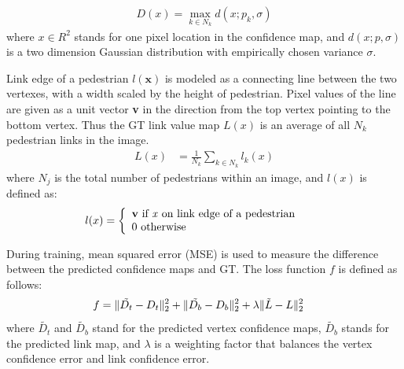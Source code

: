 \documentclass[runningheads]{llncs}
\begin{document}
\begin{align}
	D(x)=\max\limits_{k \in {N_{k}}} d(x; p_{k},\sigma)
\end{align}
where $x \in R^{2}$ stands for one pixel location in the confidence map, and $d(x; p,\sigma)$ is a two dimension Gaussian distribution with empirically chosen variance $\sigma$.

Link edge of a pedestrian $l(\textbf{x})$ is modeled as a connecting line between the two vertexes, with a width scaled by the height of pedestrian. Pixel values of the line are given as a unit vector {\bf v} in the direction from the top vertex pointing to the bottom vertex. Thus the GT link value map $L(x)$ is an average of all ${N_{k}}$ pedestrian links in the image.
\begin{align}
	L(x) &= \frac{1}{N_{k}} \sum\limits_{k \in {N_{k}}} l_{k}(x)
\end{align}
where ${N_{j}}$ is the total number of pedestrians within an image, and $l(x)$ is defined as:
\begin{align}
	l(x) &= \left\{
	\begin{array}{lr}
		{\bf v} \text{  if \textit{x} on link edge of a pedestrian} & \\
		0 \text{  otherwise} &
	\end{array}
	\right.
\end{align}

During training,  mean squared error (MSE) is used to measure the difference between the predicted conﬁdence maps and GT. The loss function $f$ is deﬁned as follows:
\begin{align}
	f &=\Arrowvert\tilde{D_{t}}-D_{t}\Arrowvert_{2}^{2} + \Arrowvert\tilde{D_{b}}-D_{b}\Arrowvert_{2}^{2} + \lambda \Arrowvert\tilde{L}-L\Arrowvert_{2}^{2}
\end{align}
where  $\tilde{D_{t}}$ and $\tilde{D_{b}}$ stand for the predicted vertex conﬁdence maps, $\tilde{D_{b}}$ stands for the predicted link map, and $\lambda$ is a weighting factor that balances the vertex confidence error and link confidence error. 
\end{document}
